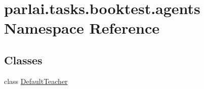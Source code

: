 \hypertarget{namespaceparlai_1_1tasks_1_1booktest_1_1agents}{}\section{parlai.\+tasks.\+booktest.\+agents Namespace Reference}
\label{namespaceparlai_1_1tasks_1_1booktest_1_1agents}
\subsection*{Classes}
\begin{DoxyCompactItemize}
\item 
class \hyperlink{classparlai_1_1tasks_1_1booktest_1_1agents_1_1DefaultTeacher}{Default\+Teacher}
\end{DoxyCompactItemize}
